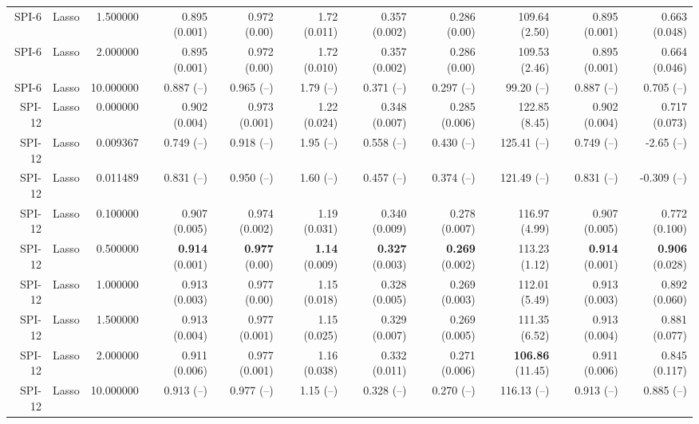 \begin{table}
\begin{tabular}{rrrrrrrrrrr}
 SPI-6 & Lasso & 1.500000 & 0.895 (0.001) & 0.972 (0.00) & 1.72 (0.011) & 0.357 (0.002) & 0.286 (0.00) & 109.64 (2.50) & 0.895 (0.001) & 0.663 (0.048) \\
 SPI-6 & Lasso & 2.000000 & 0.895 (0.001) & 0.972 (0.00) & 1.72 (0.010) & 0.357 (0.002) & 0.286 (0.00) & 109.53 (2.46) & 0.895 (0.001) & 0.664 (0.046) \\
 SPI-6 & Lasso & 10.000000 & 0.887 (--) & 0.965 (--) & 1.79 (--) & 0.371 (--) & 0.297 (--) & 99.20 (--) & 0.887 (--) & 0.705 (--) \\
SPI-12 & Lasso & 0.000000 & 0.902 (0.004) & 0.973 (0.001) & 1.22 (0.024) & 0.348 (0.007) & 0.285 (0.006) & 122.85 (8.45) & 0.902 (0.004) & 0.717 (0.073) \\
SPI-12 & Lasso & 0.009367 & 0.749 (--) & 0.918 (--) & 1.95 (--) & 0.558 (--) & 0.430 (--) & 125.41 (--) & 0.749 (--) & -2.65 (--) \\
SPI-12 & Lasso & 0.011489 & 0.831 (--) & 0.950 (--) & 1.60 (--) & 0.457 (--) & 0.374 (--) & 121.49 (--) & 0.831 (--) & -0.309 (--) \\
SPI-12 & Lasso & 0.100000 & 0.907 (0.005) & 0.974 (0.002) & 1.19 (0.031) & 0.340 (0.009) & 0.278 (0.007) & 116.97 (4.99) & 0.907 (0.005) & 0.772 (0.100) \\
SPI-12 & Lasso & 0.500000 & { \bf 0.914} (0.001) & { \bf 0.977} (0.00) & { \bf 1.14} (0.009) & { \bf 0.327} (0.003) & { \bf 0.269} (0.002) & 113.23 (1.12) & { \bf 0.914} (0.001) & { \bf 0.906} (0.028) \\
SPI-12 & Lasso & 1.000000 & 0.913 (0.003) & 0.977 (0.00) & 1.15 (0.018) & 0.328 (0.005) & 0.269 (0.003) & 112.01 (5.49) & 0.913 (0.003) & 0.892 (0.060) \\
SPI-12 & Lasso & 1.500000 & 0.913 (0.004) & 0.977 (0.001) & 1.15 (0.025) & 0.329 (0.007) & 0.269 (0.005) & 111.35 (6.52) & 0.913 (0.004) & 0.881 (0.077) \\
SPI-12 & Lasso & 2.000000 & 0.911 (0.006) & 0.977 (0.001) & 1.16 (0.038) & 0.332 (0.011) & 0.271 (0.006) & { \bf 106.86} (11.45) & 0.911 (0.006) & 0.845 (0.117) \\
SPI-12 & Lasso & 10.000000 & 0.913 (--) & 0.977 (--) & 1.15 (--) & 0.328 (--) & 0.270 (--) & 116.13 (--) & 0.913 (--) & 0.885 (--) \\
\bottomrule
\end{tabular}
\end{table}

